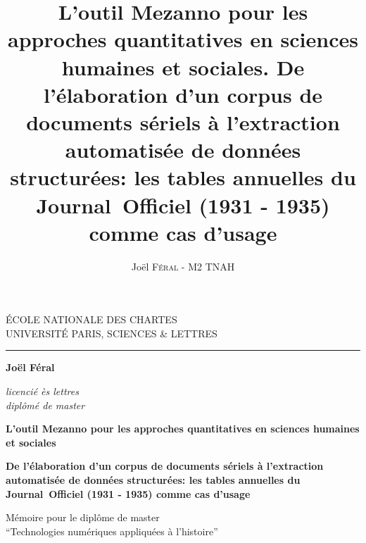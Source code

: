 \documentclass[12pt,twoside]{book}
\author{Joël \textsc{Féral} - M2 TNAH}
\title{L'outil Mezanno pour les approches quantitatives en sciences humaines et sociales. De l'élaboration d'un corpus de documents sériels à l'extraction automatisée de données structurées: les tables annuelles du \hbox{Journal Officiel} (1931 - 1935) comme cas d'usage}
\begin{document}
	\begin{titlepage}
		\begin{center}
			
			\bigskip
			
			\begin{large}				
				ÉCOLE NATIONALE DES CHARTES\\
				UNIVERSITÉ PARIS, SCIENCES \& LETTRES
			\end{large}
			\begin{center}\rule{2cm}{0.02cm}\end{center}
			
			\bigskip
			\bigskip
			\bigskip
			\begin{Large}
				\textbf{Joël Féral}\\
			\end{Large}
			\begin{normalsize} \textit{licencié ès lettres}\\
				\textit{diplômé de master}
			\end{normalsize}
			
			\bigskip
			\bigskip
			\bigskip
			
			\begin{Huge}
				\textbf{L'outil Mezanno pour les approches quantitatives en sciences humaines et sociales}\\
			\end{Huge}
			\bigskip
			\bigskip
			\begin{LARGE}
				\textbf{De l'élaboration d'un corpus de documents sériels à l'extraction automatisée de données structurées: les tables annuelles du \hbox{Journal Officiel} (1931 - 1935) comme cas d'usage}\\
			\end{LARGE}
			
			\bigskip
			\bigskip
			\bigskip
			\begin{large}
			\end{large}
			\vfill
			
			\begin{large}
				Mémoire 
				pour le diplôme de master \\
				\enquote{Technologies numériques appliquées à l'histoire} \\
			\end{large}
			
		\end{center}
	\end{titlepage}

	\thispagestyle{empty}	
	\cleardoublepage
	
\end{document}
